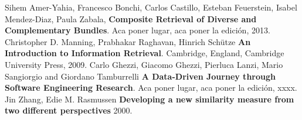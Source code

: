 \begin{thebibliography}{9}
  Sihem Amer-Yahia, Francesco Bonchi, Carlos Castillo,
  Esteban Feuerstein, Isabel Mendez-Diaz, Paula Zabala,
  \textbf{Composite Retrieval of Diverse and Complementary Bundles}.
  Aca poner lugar,
  aca poner la edición,
  2013.
  Christopher D. Manning, Prabhakar Raghavan, Hinrich Schütze
  \textbf{An Introduction to Information Retrieval}.
  Cambridge, England,
  Cambridge University Press,
  2009.
  Carlo Ghezzi, Giacomo Ghezzi, Pierluca Lanzi, Mario Sangiorgio and Giordano Tamburrelli
  \textbf{A Data-Driven Journey through Software Engineering Research}.
  Aca poner lugar,
  aca poner la edición,
  xxxx.
Jin Zhang, Edie M. Rasmussen
\textbf{Developing a new similarity measure from two different perspectives}
2000.
\end{thebibliography} 
